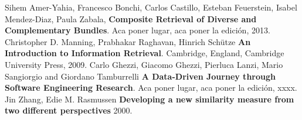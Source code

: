 \begin{thebibliography}{9}
  Sihem Amer-Yahia, Francesco Bonchi, Carlos Castillo,
  Esteban Feuerstein, Isabel Mendez-Diaz, Paula Zabala,
  \textbf{Composite Retrieval of Diverse and Complementary Bundles}.
  Aca poner lugar,
  aca poner la edición,
  2013.
  Christopher D. Manning, Prabhakar Raghavan, Hinrich Schütze
  \textbf{An Introduction to Information Retrieval}.
  Cambridge, England,
  Cambridge University Press,
  2009.
  Carlo Ghezzi, Giacomo Ghezzi, Pierluca Lanzi, Mario Sangiorgio and Giordano Tamburrelli
  \textbf{A Data-Driven Journey through Software Engineering Research}.
  Aca poner lugar,
  aca poner la edición,
  xxxx.
Jin Zhang, Edie M. Rasmussen
\textbf{Developing a new similarity measure from two different perspectives}
2000.
\end{thebibliography} 
